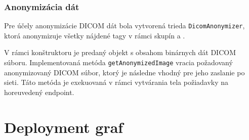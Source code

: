 \subsubsection {Anonymizácia dát}
Pre účely anonymizácie DICOM dát bola vytvorená trieda \texttt{DicomAnonymizer}, ktorá anonymizuje všetky nájdené tagy v rámci skupín  a .

V rámci konštruktoru je predaný objekt s obsahom binárnych dát DICOM súboru. Implementovaná metóda \texttt{getAnonymizedImage} vracia požadovaný anonymizovaný DICOM súbor, ktorý je následne vhodný pre jeho zaslanie po sieti. Táto metóda je exekuovaná v rámci vytvárania tela požiadavky na horeuvedený endpoint.

\section {Deployment graf}